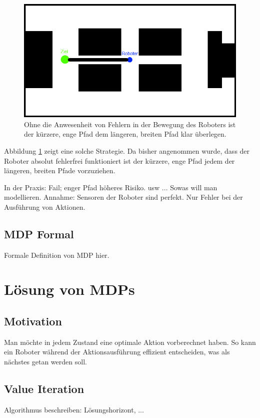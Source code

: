 \documentclass[a4paper]{IEEEtran}
\begin{document}
\begin{figure}[ht]
	\centering
	\includegraphics[scale=0.42]{images/autnmRobot_directPath.png}
	\caption{Ohne die Anwesenheit von Fehlern in der Bewegung des Roboters ist der kürzere, enge Pfad dem längeren, breiten Pfad klar überlegen.}
	\label{fig:holoch_autnmRob_dirPath}
\end{figure}
Abbildung \ref{fig:holoch_autnmRob_dirPath} zeigt eine solche Strategie. Da bisher angenommen wurde, dass der Roboter absolut fehlerfrei funktioniert ist der kürzere, enge Pfad jedem der längeren, breiten Pfade vorzuziehen.

In der Praxis: Fail; enger Pfad höheres Risiko. usw ... Sowas will man modellieren.
Annahme: Sensoren der Roboter sind perfekt. Nur Fehler bei der Ausführung von Aktionen.

\subsection{MDP Formal}
Formale Definition von MDP hier.


\section{Lösung von MDPs}
\subsection{Motivation}
Man möchte in jedem Zustand eine optimale Aktion vorberechnet haben. So kann ein Roboter während der Aktionsausführung effizient entscheiden, was als nächstes getan werden soll.

\subsection{Value Iteration} %
Algorithmus beschreiben: Lösungshorizont, ...
\end{document}
